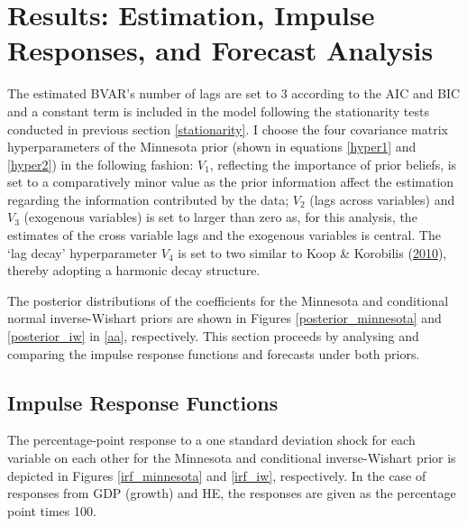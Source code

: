 \documentclass[11pt,preprint, authoryear]{elsarticle}
\numberwithin{equation}{section}
\numberwithin{figure}{section}
\numberwithin{table}{section}
\begin{document}
\hypertarget{results-estimation-impulse-responses-and-forecast-analysis}{%
\section{\texorpdfstring{Results: Estimation, Impulse Responses, and
Forecast Analysis
\label{est}}{Results: Estimation, Impulse Responses, and Forecast Analysis }}\label{results-estimation-impulse-responses-and-forecast-analysis}}

The estimated BVAR's number of lags are set to 3 according to the AIC
and BIC and a constant term is included in the model following the
stationarity tests conducted in previous section \ref{stationarity}. I
choose the four covariance matrix hyperparameters of the Minnesota prior
(shown in equations \ref{hyper1} and \ref{hyper2}) in the following
fashion: \(V_1\), reflecting the importance of prior beliefs, is set to
a comparatively minor value as the prior information affect the
estimation regarding the information contributed by the data; \(V_2\)
(lags across variables) and \(V_3\) (exogenous variables) is set to
larger than zero as, for this analysis, the estimates of the cross
variable lags and the exogenous variables is central. The `lag decay'
hyperparameter \(V_4\) is set to two similar to Koop \& Korobilis
(\protect\hyperlink{ref-koop2010}{2010}), thereby adopting a harmonic
decay structure.

The posterior distributions of the coefficients for the Minnesota and
conditional normal inverse-Wishart priors are shown in Figures
\ref{posterior_minnesota} and \ref{posterior_iw} in \ref{aa},
respectively. This section proceeds by analysing and comparing the
impulse response functions and forecasts under both priors.

\hypertarget{impulse-response-functions}{%
\subsection{Impulse Response
Functions}\label{impulse-response-functions}}

The percentage-point response to a one standard deviation shock for each
variable on each other for the Minnesota and conditional inverse-Wishart
prior is depicted in Figures \ref{irf_minnesota} and \ref{irf_iw},
respectively. In the case of responses from GDP (growth) and HE, the
responses are given as the percentage point times 100.
\end{document}
